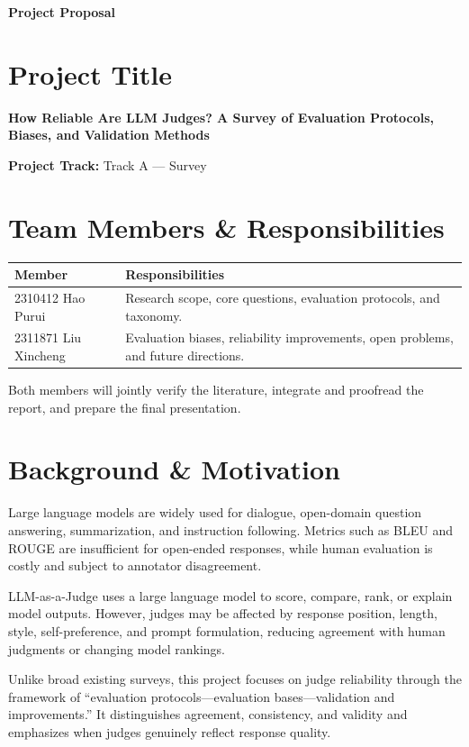 \documentclass[10pt]{article}
\begin{document}
\begin{center}
{\large\bfseries Project Proposal}\\[-1pt]
\end{center}

\section{Project Title}
\textbf{How Reliable Are LLM Judges? A Survey of Evaluation Protocols, Biases, and Validation Methods}

\textbf{Project Track:} Track A --- Survey

\section{Team Members \& Responsibilities}
\begin{tabularx}{\linewidth}{@{}lX@{}}
\toprule
\textbf{Member} & \textbf{Responsibilities}\\
\midrule
2310412 Hao Purui & Research scope, core questions, evaluation protocols, and taxonomy.\\
2311871 Liu Xincheng & Evaluation biases, reliability improvements, open problems, and future directions.\\
\bottomrule
\end{tabularx}

Both members will jointly verify the literature, integrate and proofread the report, and prepare the final presentation.

\section{Background \& Motivation}
Large language models are widely used for dialogue, open-domain question answering, summarization, and instruction following. Metrics such as BLEU and ROUGE are insufficient for open-ended responses, while human evaluation is costly and subject to annotator disagreement.

LLM-as-a-Judge uses a large language model to score, compare, rank, or explain model outputs. However, judges may be affected by response position, length, style, self-preference, and prompt formulation, reducing agreement with human judgments or changing model rankings.

Unlike broad existing surveys, this project focuses on judge reliability through the framework of ``evaluation protocols---evaluation bases---validation and improvements.'' It distinguishes agreement, consistency, and validity and emphasizes when judges genuinely reflect response quality.
\end{document}
